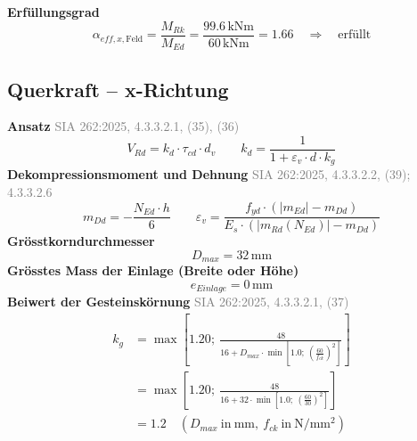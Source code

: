 \documentclass[11pt,a4paper]{article}
\newcommand{\normref}[1]{{\small\textcolor{gray}{#1}}}
\begin{document}
\noindent\textbf{Erfüllungsgrad}
\begin{equation*}
\alpha_{eff,x,\text{Feld}} = \frac{M_{Rk}}{M_{Ed}} = \frac{99.6\,\mathrm{kNm}}{60\,\mathrm{kNm}} = 1.66 \quad \Rightarrow \quad \text{erfüllt}
\end{equation*}
\subsection{Querkraft – x-Richtung}
\noindent\textbf{Ansatz} \hfill \normref{SIA 262:2025, 4.3.3.2.1, (35), (36)}
\begin{equation*}
V_{Rd} = k_d \cdot \tau_{cd} \cdot d_v \qquad k_d = \frac{1}{1 + \varepsilon_v \cdot d \cdot k_g}
\end{equation*}
\noindent\textbf{Dekompressionsmoment und Dehnung} \hfill \normref{SIA 262:2025, 4.3.3.2.2, (39); 4.3.3.2.6}
\begin{equation*}
m_{Dd} = -\frac{N_{Ed} \cdot h}{6} \qquad \varepsilon_v = \frac{f_{yd} \cdot \left(\left|m_{Ed}\right| - m_{Dd}\right)}{E_s \cdot \left(\left|m_{Rd}(N_{Ed})\right| - m_{Dd}\right)}
\end{equation*}
\noindent\textbf{Grösstkorndurchmesser}
\begin{equation*}
D_{max} = 32\,\mathrm{mm}
\end{equation*}
\noindent\textbf{Grösstes Mass der Einlage (Breite oder Höhe)}
\begin{equation*}
e_{Einlage} = 0\,\mathrm{mm}
\end{equation*}
\noindent\textbf{Beiwert der Gesteinskörnung} \hfill \normref{SIA 262:2025, 4.3.3.2.1, (37)}
\begin{equation*}
\begin{aligned}
  k_g &= \max\left[1.20;\ \frac{48}{16 + D_{max} \cdot \min\left[1.0;\ \left(\frac{60}{f_{ck}}\right)^{2}\right]}\right] \\
  &= \max\left[1.20;\ \frac{48}{16 + 32 \cdot \min\left[1.0;\ \left(\frac{60}{30}\right)^{2}\right]}\right] \\
  &= 1.2 \quad \left(D_{max}\ \text{in}\ \mathrm{mm},\ f_{ck}\ \text{in}\ \mathrm{N}/\mathrm{mm}^{2}\right)
\end{aligned}
\end{equation*}
\end{document}
